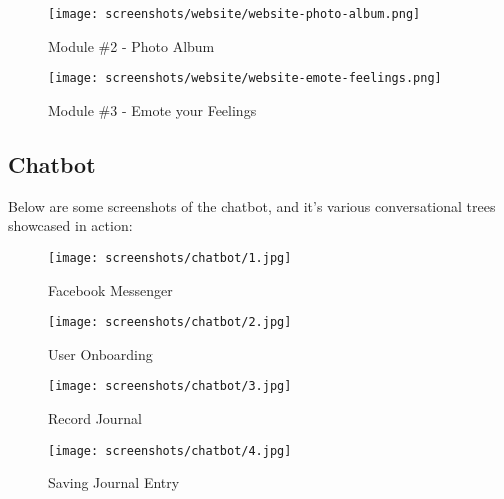\pagebreak

\vspace*{\fill}
\begin{figure}[H]
    \centering
    \texttt{[image: screenshots/website/website-photo-album.png]}
    \caption{Module \#2 - Photo Album}
\end{figure}

\begin{figure}[H]
    \centering
    \texttt{[image: screenshots/website/website-emote-feelings.png]}
    \caption{Module \#3 - Emote your Feelings}
\end{figure}
\vspace*{\fill}

\pagebreak

\subsection{Chatbot}

\noindent
Below are some screenshots of the chatbot, and it’s various conversational trees showcased in action:

\vspace*{\fill}
\begin{figure}[H]
    \centering
    \begin{minipage}{0.45\textwidth}
        \centering
        \texttt{[image: screenshots/chatbot/1.jpg]}
        \caption{Facebook Messenger}
    \end{minipage}\hfill
    \begin{minipage}{0.45\textwidth}
        \centering
        \texttt{[image: screenshots/chatbot/2.jpg]}
        \caption{User Onboarding}
    \end{minipage}
\end{figure}
\vspace*{\fill}

\pagebreak

\vspace*{\fill}
\begin{figure}[H]
    \centering
    \begin{minipage}{0.45\textwidth}
        \centering
        \texttt{[image: screenshots/chatbot/3.jpg]}
        \caption{Record Journal}
    \end{minipage}\hfill
    \begin{minipage}{0.45\textwidth}
        \centering
        \texttt{[image: screenshots/chatbot/4.jpg]}
        \caption{Saving Journal Entry}
    \end{minipage}
\end{figure}
\vspace*{\fill}

